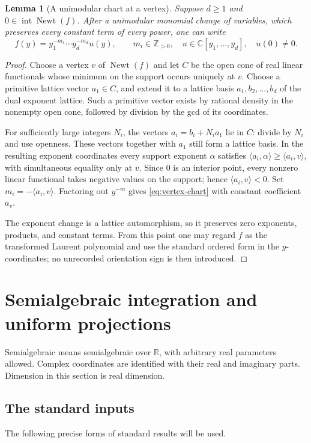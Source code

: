 \documentclass[11pt]{article}
\numberwithin{equation}{section}
\newtheorem{lemma}[theorem]{Lemma}
\theoremstyle{definition}
\theoremstyle{remark}
\newcommand{\C}{\mathbb C}
\newcommand{\R}{\mathbb R}
\newcommand{\Z}{\mathbb Z}
\newcommand{\Newt}{\operatorname{Newt}}
\newcommand{\Int}{\operatorname{int}}
\newcommand{\pair}[2]{\langle #1,#2\rangle}
\begin{document}
\begin{lemma}[A unimodular chart at a vertex]\label{lem:chart}
Suppose $d\ge1$ and $0\in\Int\Newt(f)$. After a unimodular monomial
change of variables, which preserves every constant term of every power,
one can write
\begin{equation}\label{eq:vertex-chart}
 f(y)=y_1^{-m_1}\cdots y_d^{-m_d}u(y),
 \qquad m_i\in\Z_{>0},\quad u\in\C[y_1,\ldots,y_d],\quad u(0)\ne0.
\end{equation}
\end{lemma}
\begin{proof}
Choose a vertex $v$ of $\Newt(f)$ and let $C$ be the open cone of real
linear functionals whose minimum on the support occurs uniquely at $v$.
Choose a primitive lattice vector $a_1\in C$, and extend it to a lattice
basis $a_1,b_2,\ldots,b_d$ of the dual exponent lattice. Such a primitive
vector exists by rational density in the nonempty open cone, followed by
division by the gcd of its coordinates.

For sufficiently large integers $N_i$, the vectors
$a_i=b_i+N_i a_1$ lie in $C$: divide by $N_i$ and use openness. These
vectors together with $a_1$ still form a lattice basis. In the resulting
exponent coordinates every support exponent $\alpha$ satisfies
$\pair{a_i}{\alpha}\ge\pair{a_i}{v}$, with simultaneous equality only
at $v$. Since $0$ is an interior point, every nonzero linear functional
takes negative values on the support; hence $\pair{a_i}{v}<0$.
Set $m_i=-\pair{a_i}{v}$. Factoring out $y^{-m}$ gives
\eqref{eq:vertex-chart} with constant coefficient $a_v$.

The exponent change is a lattice automorphism, so it preserves zero
exponents, products, and constant terms. From this point one may regard
$f$ as the transformed Laurent polynomial and use the standard ordered
form in the $y$-coordinates; no unrecorded orientation sign is then
introduced.
\end{proof}

\section{Semialgebraic integration and uniform projections}\label{sec:sa}
Semialgebraic means semialgebraic over $\R$, with arbitrary real
parameters allowed. Complex coordinates are identified with their real
and imaginary parts. Dimension in this section is real dimension.

\subsection{The standard inputs}
The following precise forms of standard results will be used.
\end{document}
